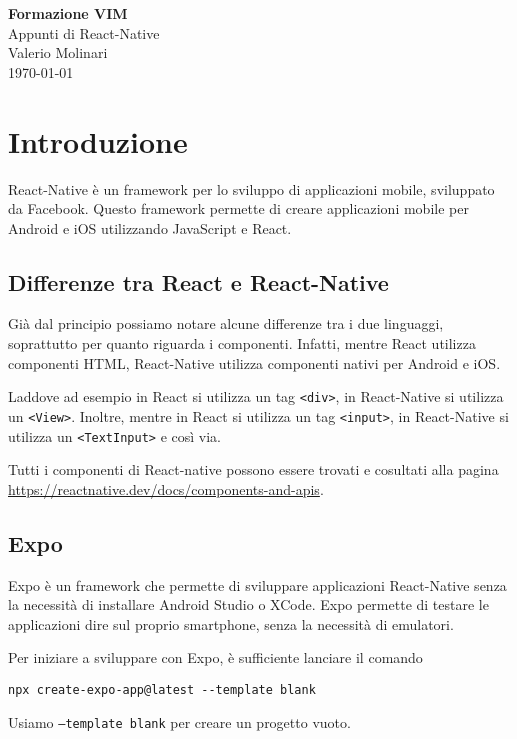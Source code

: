 \documentclass[12pt]{article}
\begin{document}
\begin{titlepage}
\begin{center}
\vspace*{3cm}
\Huge\textcolor{primary}{\textbf{Formazione VIM}} \\[1cm]
\Large\textcolor{secondary}{Appunti di React-Native} \\[1cm]
\textcolor{accent}{Valerio Molinari}\\
\vfill
\today
\end{center}
\end{titlepage}

\tableofcontents
\newpage

\section{Introduzione}
React-Native è un framework per lo sviluppo di applicazioni mobile, sviluppato da Facebook. 
Questo framework permette di creare applicazioni mobile per Android e iOS utilizzando JavaScript e React.

\subsection{Differenze tra React e React-Native}
Già dal principio possiamo notare alcune differenze tra i due linguaggi, soprattutto
per quanto riguarda i componenti. Infatti, mentre React utilizza componenti HTML, React-Native
utilizza componenti nativi per Android e iOS.

Laddove ad esempio in React si utilizza un tag \texttt{<div>}, in React-Native si utilizza un
\texttt{<View>}. Inoltre, mentre in React si utilizza un tag \texttt{<input>}, in React-Native si
utilizza un \texttt{<TextInput>} e così via.

Tutti i componenti di React-native possono essere trovati
e cosultati alla pagina \\\url{https://reactnative.dev/docs/components-and-apis}.

\subsection{Expo}
Expo è un framework che permette di sviluppare applicazioni React-Native senza la necessità di
installare Android Studio o XCode. Expo permette di testare le applicazioni dire
sul proprio smartphone, senza la necessità di emulatori.

Per iniziare a sviluppare con Expo, è sufficiente lanciare il comando
\begin{highlight}
\begin{verbatim}
npx create-expo-app@latest --template blank
\end{verbatim}
\end{highlight}
Usiamo \texttt{--template blank} per creare un progetto vuoto.
\end{document}
